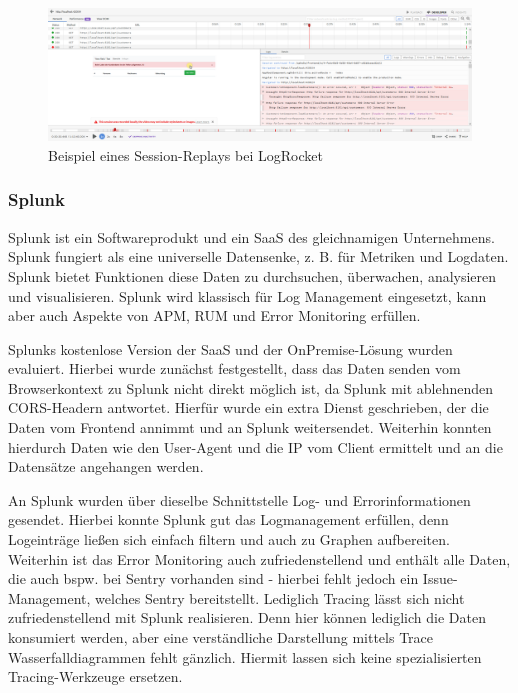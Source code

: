 \begin{figure}[H]
	\centering
	\includegraphics[width=\linewidth]{img/03_methoden/logrocket_session-replay-example.png}
	\caption{Beispiel eines Session-Replays bei LogRocket}
	\label{fig:logrocket-session-replay-example}
\end{figure}

\subsubsection{Splunk}

Splunk \cite{Splunk} ist ein Softwareprodukt und ein SaaS des gleichnamigen Unternehmens. Splunk fungiert als eine universelle Datensenke, z. B. für Metriken und Logdaten. Splunk bietet Funktionen diese Daten zu durchsuchen, überwachen, analysieren und visualisieren. Splunk wird klassisch für Log Management eingesetzt, kann aber auch Aspekte von APM, RUM und Error Monitoring erfüllen.

Splunks kostenlose Version der SaaS und der OnPremise-Lösung wurden evaluiert. Hierbei wurde zunächst festgestellt, dass das Daten senden vom Browserkontext zu Splunk nicht direkt möglich ist, da Splunk mit ablehnenden CORS-Headern antwortet. Hierfür wurde ein extra Dienst geschrieben, der die Daten vom Frontend annimmt und an Splunk weitersendet. Weiterhin konnten hierdurch Daten wie den User-Agent und die IP vom Client ermittelt und an die Datensätze angehangen werden.

An Splunk wurden über dieselbe Schnittstelle Log- und Errorinformationen gesendet. Hierbei konnte Splunk gut das Logmanagement erfüllen, denn Logeinträge ließen sich einfach filtern und auch zu Graphen aufbereiten. Weiterhin ist das Error Monitoring auch zufriedenstellend und enthält alle Daten, die auch bspw. bei Sentry vorhanden sind - hierbei fehlt jedoch ein Issue-Management, welches Sentry bereitstellt. Lediglich Tracing lässt sich nicht zufriedenstellend mit Splunk realisieren. Denn hier können lediglich die Daten konsumiert werden, aber eine verständliche Darstellung mittels Trace Wasserfalldiagrammen fehlt gänzlich. Hiermit lassen sich keine spezialisierten Tracing-Werkzeuge ersetzen.

